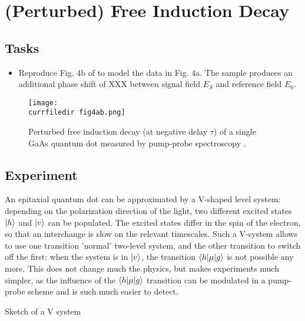 \renewcommand{\lastmod}{April 7, 2020}


\chapter{(Perturbed) Free Induction Decay}



\section{Tasks}

\begin{itemize}
\item Reproduce Fig. 4b of \cite{Wolpert:2012hs} to model the data in Fig. 4a. The sample produces an additional phase shift of XXX between signal field $E_S$ and reference field $E_0$.
\end{itemize}

\begin{figure}
\centering
\texttt{[image: \\currfiledir fig4ab.png]}
\caption{Perturbed free induction decay (at negative delay $\tau$) of a single GaAs quantum dot measured by pump-probe spectroscopy \citep{Wolpert:2012hs}.}
\end{figure}

\section{Experiment}

An epitaxial quantum dot can be approximated by a V-shaped level system: depending on the polarization direction of the light, two different excited states $\ket{h}$ and $\ket{v}$
 can be populated. The excited states differ in the spin of the electron, so that an interchange is slow on the relevant timescales. Such a V-system allows to use one transition 'normal' two-level system, and the other transition to switch off the first: when the system is in $\ket{v}$, the transition $\braket{h | \mu | g}$ is not possible any more. This does not change much the physics, but makes experiments much simpler, as the influence of the  $\braket{h | \mu | g}$ transition can be modulated in a pump-probe scheme and is such much easier to detect.
 
\begin{marginfigure}

\caption{Sketch of a V system}
\end{marginfigure}


